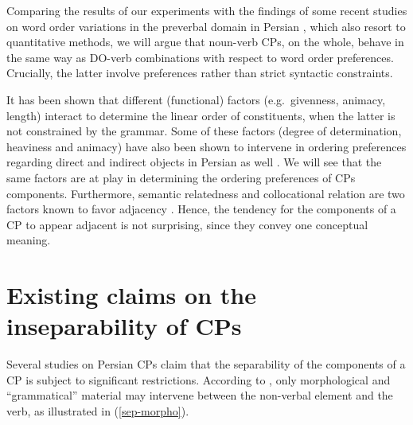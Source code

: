 \documentclass[output=paper]{langsci/langscibook}
\begin{document}
Comparing the results of our experiments with the findings of some recent studies on word order variations in the preverbal domain in Persian \citep{FaghiriPhd,FagSam2014,FagSamHem2018}, which also resort to quantitative methods, we will argue that noun-verb CPs, on the whole, behave in the same way as DO-verb combinations with respect to word order preferences. Crucially, the latter involve preferences rather than strict syntactic constraints. 


It has been shown that different (functional) factors (e.g.~givenness, animacy, length) interact to determine the linear order of constituents, when the latter is not constrained by the grammar. Some of these factors (degree of determination, heaviness and animacy) have also been shown to intervene in ordering preferences regarding direct and indirect objects in Persian as well \citep{FaghiriPhd}. We will see that the same factors are at play in determining the ordering preferences of CPs components. Furthermore, semantic relatedness and collocational relation are two factors known to favor adjacency \citep[see e.g.][]{hawkins2001,wasow2002}. Hence, the tendency for the components of a CP to appear adjacent is not surprising, since they convey one conceptual meaning. 

\section{Existing claims on the inseparability of CPs}\label{Sec:Claims}

Several studies on Persian CPs claim that the separability of the components of a CP is subject to significant restrictions. According to \citet{Goldberg1996}, only morphological and ``grammatical'' material may intervene between the non-verbal element and the verb, as illustrated in (\ref{sep-morpho}).

\begin{exe}
	\ex \label{sep-morpho}
	\begin{xlist}
	\end{xlist}
\end{exe}
\end{document}
